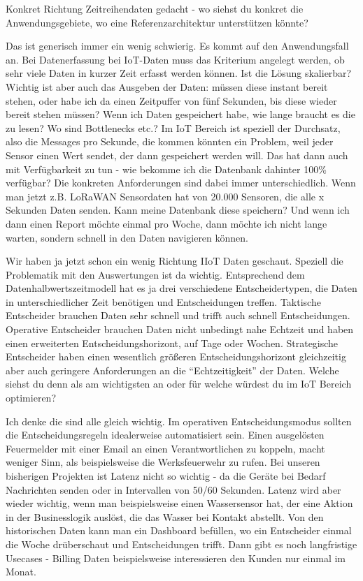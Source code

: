 \LF Konkret Richtung Zeitreihendaten gedacht - wo siehst du konkret die Anwendungsgebiete, wo eine Referenzarchitektur unterstützen könnte?

\RB Das ist generisch immer ein wenig schwierig. Es kommt auf den Anwendungsfall an. Bei Datenerfassung bei \ac{IoT}-Daten muss das Kriterium angelegt werden, ob sehr viele Daten in kurzer Zeit erfasst werden können. Ist die Lösung skalierbar? Wichtig ist aber auch das Ausgeben der Daten: müssen diese instant bereit stehen, oder habe ich da einen Zeitpuffer von fünf Sekunden, bis diese wieder bereit stehen müssen? Wenn ich Daten gespeichert habe, wie lange braucht es die zu lesen? Wo sind Bottlenecks etc.? Im \ac{IoT} Bereich ist speziell der Durchsatz, also die Messages pro Sekunde, die kommen könnten ein Problem, weil jeder Sensor einen Wert sendet, der dann gespeichert werden will. Das hat dann auch mit Verfügbarkeit zu tun - wie bekomme ich die Datenbank dahinter 100\% verfügbar? Die konkreten Anforderungen sind dabei immer unterschiedlich. Wenn man jetzt z.B. \ac{LoRaWAN} Sensordaten hat von 20.000 Sensoren, die alle x Sekunden Daten senden. Kann meine Datenbank diese speichern? Und wenn ich dann einen Report möchte einmal pro Woche, dann möchte ich nicht lange warten, sondern schnell in den Daten navigieren können.

\LF Wir haben ja jetzt schon ein wenig Richtung \ac{IIoT} Daten geschaut. Speziell die Problematik mit den Auswertungen ist da wichtig. Entsprechend dem Datenhalbwertszeitmodell hat es ja drei verschiedene Entscheidertypen, die Daten in unterschiedlicher Zeit benötigen und Entscheidungen treffen. Taktische Entscheider brauchen Daten sehr schnell und trifft auch schnell Entscheidungen. Operative Entscheider brauchen Daten nicht unbedingt nahe Echtzeit und haben einen erweiterten Entscheidungshorizont, auf Tage oder Wochen. Strategische Entscheider haben einen wesentlich größeren Entscheidungshorizont gleichzeitig aber auch geringere Anforderungen an die \enquote{Echtzeitigkeit} der Daten. Welche siehst du denn als am wichtigsten an oder für welche würdest du im \ac{IoT} Bereich optimieren?

\RB Ich denke die sind alle gleich wichtig. Im operativen Entscheidungsmodus sollten die Entscheidungsregeln idealerweise automatisiert sein. Einen ausgelösten Feuermelder mit einer Email an einen Verantwortlichen zu koppeln, macht weniger Sinn, als beispielsweise die Werksfeuerwehr zu rufen. Bei unseren bisherigen Projekten ist Latenz nicht so wichtig - da die Geräte bei Bedarf Nachrichten senden oder in Intervallen von 50/60 Sekunden. Latenz wird aber wieder wichtig, wenn man beispielsweise einen Wassersensor hat, der eine Aktion in der Businesslogik auslöst, die das Wasser bei Kontakt abstellt. Von den historischen Daten kann man ein Dashboard befüllen, wo ein Entscheider einmal die Woche drüberschaut und Entscheidungen trifft. Dann gibt es noch langfristige Usecases - Billing Daten beispielsweise interessieren den Kunden nur einmal im Monat.

